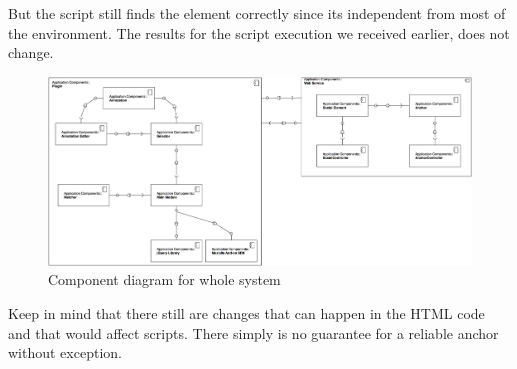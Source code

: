 But the script still finds the element correctly since its independent from most of the environment. The results for the script execution we received earlier, does
 not
 change. 

\begin{figure}\centering
	\includegraphics[width=13cm]{images/component-wholesystem-diagram.png}
	\caption{Component diagram for whole system}
	\label{component-wholesystem-diagram}
\end{figure}

Keep in mind that there still are changes that can happen in the HTML code and that would affect scripts. There simply is no guarantee for a reliable anchor without exception.

\newpage

 
